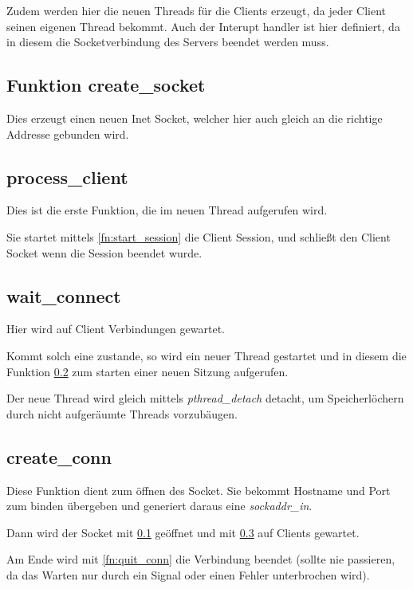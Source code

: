 \documentclass[pdftex,final,a4paper,10pt,notitlepage,halfparskip]{scrreprt}
\begin{document}
Zudem werden hier die neuen Threads für die Clients erzeugt, da jeder Client seinen eigenen Thread bekommt. Auch der Interupt handler ist hier definiert, da in diesem die Socketverbindung des Servers beendet werden muss.

\subsection{Funktion create\_socket}\label{fn:create_socket}
Dies erzeugt einen neuen Inet Socket, welcher hier auch gleich an die richtige Addresse gebunden wird.

\subsection{process\_client}\label{fn:process_client}
Dies ist die erste Funktion, die im neuen Thread aufgerufen wird.

Sie startet mittels \ref{fn:start_session} die Client Session, und schließt den Client Socket wenn die Session beendet wurde.

\subsection{wait\_connect}\label{fn:wait_connect}
Hier wird auf Client Verbindungen gewartet. 

Kommt solch eine zustande, so wird ein neuer Thread gestartet und in diesem die Funktion \ref{fn:process_client} zum starten einer neuen Sitzung aufgerufen.

Der neue Thread wird gleich mittels \textit{pthread\_detach} detacht, um Speicherlöchern durch nicht aufgeräumte Threads vorzubäugen.

\subsection{create\_conn}\label{create_conn}
Diese Funktion dient zum öffnen des Socket. Sie bekommt Hostname und Port zum binden übergeben und generiert daraus eine \textit{sockaddr\_in}.

Dann wird der Socket mit \ref{fn:create_socket} geöffnet und mit \ref{fn:wait_connect} auf Clients gewartet.

Am Ende wird mit \ref{fn:quit_conn} die Verbindung beendet (sollte nie passieren, da das Warten nur durch ein Signal oder einen Fehler unterbrochen wird).

\end{document}
